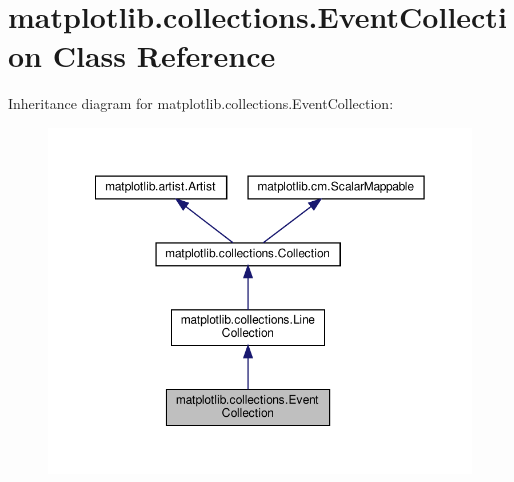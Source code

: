 \hypertarget{classmatplotlib_1_1collections_1_1EventCollection}{}\section{matplotlib.\+collections.\+Event\+Collection Class Reference}
\label{classmatplotlib_1_1collections_1_1EventCollection}


Inheritance diagram for matplotlib.\+collections.\+Event\+Collection\+:
\nopagebreak
\begin{figure}[H]
\begin{center}
\leavevmode
\includegraphics[width=350pt]{classmatplotlib_1_1collections_1_1EventCollection__inherit__graph}
\end{center}
\end{figure}


